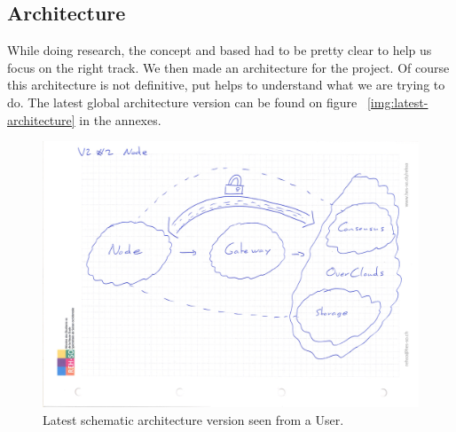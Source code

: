 
\subsection{Architecture}
While doing research, the concept and based had to be pretty clear to help us focus on the right track. We then made an architecture for the project. Of course this architecture is not definitive, put helps to understand what we are trying to do. The latest global architecture version can be found on figure ~\ref{img:latest-architecture} in the annexes.

\begin{figure}[htpb]
\centering
\begin{adjustbox}{center}
\includegraphics[scale=0.18]{annexes/concepts/Architecture-Draft-global-view-idea-2-node.jpeg}
\end{adjustbox}
\caption{Latest schematic architecture version seen from a User.
\label{img:latest-schematic-architecture-user}}  
\end{figure}

